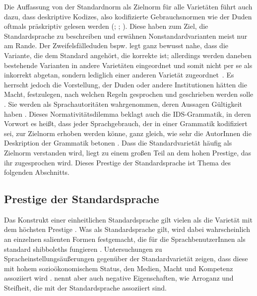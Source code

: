 Die Auffassung von der Standardnorm als Zielnorm für alle Varietäten führt auch dazu, dass deskriptive Kodizes, also kodifizierte Gebrauchsnormen \citep[s.][21]{Gloy1975} wie der Duden oftmals präskriptiv gelesen werden (\citealp[s.][236, 238]{Presch1980}; \citealp[][21]{Antos1996}; \citealp[219--220]{Klein2014}). 
Diese haben zum Ziel, die Standardsprache zu beschreiben und erwähnen Nonstandardvarianten meist nur am Rande. 
Der Zweifelsf{\"a}lleduden bspw. legt ganz bewusst nahe, dass die Variante, die dem Standard angeh{\"o}rt, die korrekte ist; allerdings werden daneben bestehende Varianten in andere Variet{\"a}ten eingeordnet und somit nicht per se als inkorrekt abgetan, sondern lediglich einer anderen Varietät zugeordnet~\citep[s.][215]{Eisenberg2007}. 
Es herrscht jedoch die Vorstellung, der Duden oder andere Institutionen hätten die Macht, festzulegen, nach welchen Regeln gesprochen und geschrieben werden solle \citep[s.][172]{Beuge2017}. 
Sie werden als Sprachautoritäten wahrgenommen, deren Aussagen Gültigkeit haben \citep[s.][222]{Klein2014}.  
Dieses \glqq Normativitätsdilemma\grqq{} \citep[29]{Hennig2009} beklagt auch die IDS-Grammatik, in deren Vorwort es heißt, dass jeder Sprachgebrauch, der in einer Grammatik kodifiziert sei, zur Zielnorm erhoben werden könne, ganz gleich, wie sehr die AutorInnen die Deskription der Grammatik betonen \citep[s.][6]{Zifonun1997}. 
Dass die Standardvarietät häufig als Zielnorm verstanden wird, liegt zu einem großen Teil an dem hohen Prestige, das ihr zugesprochen wird. 
Dieses Prestige der Standardsprache ist Thema des folgenden Abschnitts. 
\subsection{Prestige der Standardsprache}
\label{sec:Prestigevarietaet}
Das Konstrukt einer einheitlichen Standardsprache gilt vielen als die Variet{\"a}t mit dem h{\"o}chsten Prestige \citep[s.][31]{Ammon.2005}. 
Was als Standardsprache gilt, wird dabei wahrscheinlich an einzelnen salienten Formen festgemacht, die für die SprachbenutzerInnen als {\glqq}standard shibboleths{\grqq} fungieren \citep[s.][142]{Silverstein.2017}.
Untersuchungen zu %
Spracheinstellungsäußerungen %
gegen{\"u}ber der Standardvariet{\"a}t zeigen, dass diese mit hohem sozio{\"o}konomischem Status, den Medien, Macht und Kompetenz assoziiert wird %
\citep[s.][585]{Giles.1988}. 
\citet[32]{Auer.2013} nennt aber auch negative Eigenschaften, wie Arroganz und Steifheit, die mit der Standardsprache assoziiert sind. 

